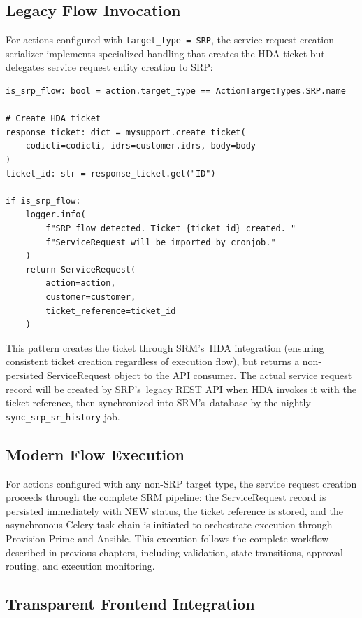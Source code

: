 \subsection{Legacy Flow Invocation}

For actions configured with \texttt{target\_type = SRP}, the service request creation serializer implements specialized handling that creates the HDA ticket but delegates service request entity creation to SRP:

\begin{verbatim}
is_srp_flow: bool = action.target_type == ActionTargetTypes.SRP.name

# Create HDA ticket
response_ticket: dict = mysupport.create_ticket(
    codicli=codicli, idrs=customer.idrs, body=body
)
ticket_id: str = response_ticket.get("ID")

if is_srp_flow:
    logger.info(
        f"SRP flow detected. Ticket {ticket_id} created. "
        f"ServiceRequest will be imported by cronjob."
    )
    return ServiceRequest(
        action=action, 
        customer=customer, 
        ticket_reference=ticket_id
    )
\end{verbatim}

This pattern creates the ticket through SRM's~HDA integration (ensuring consistent ticket creation regardless of execution flow), but returns a non-persisted ServiceRequest object to the API consumer. The actual service request record will be created by SRP's~legacy REST API when HDA invokes it with the ticket reference, then synchronized into SRM's~database by the nightly \texttt{sync\_srp\_sr\_history} job.

\subsection{Modern Flow Execution}

For actions configured with any non-SRP target type, the service request creation proceeds through the complete SRM pipeline: the ServiceRequest record is persisted immediately with NEW status, the ticket reference is stored, and the asynchronous Celery task chain is initiated to orchestrate execution through Provision Prime and Ansible. This execution follows the complete workflow described in previous chapters, including validation, state transitions, approval routing, and execution monitoring.

\subsection{Transparent Frontend Integration}

